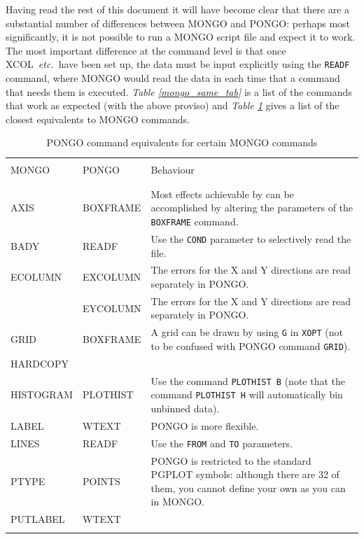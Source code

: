 \documentclass[twoside,11pt]{article}
\newcommand{\htmlref}[2]{#1}
\renewcommand{\_}{\texttt{\symbol{95}}}
\newcommand{\etc}{{\em etc.}}
\newcommand{\xcol}{{\sf XCOL}}
\newcommand{\pnam}[1]{{\tt #1}}
\newcommand{\cnam}[1]{{\tt #1}}
\newcommand{\iref} [1]{\htmlref{#1}{#1}}
\begin{document}
Having read the rest of this document it will have become clear that there
are a substantial number of differences between MONGO and PONGO: perhaps
most significantly, it is not possible to run a MONGO script file and expect it
to work.
The most important difference at the command level is that once
\xcol\ \etc\ have been set up, the data must be input explicitly using the
\cnam{\iref{READF}} command, where MONGO would read the data in each time that a
command that needs them is executed.
{\em Table \ref{mongo_same_tab}} is a list of the commands that work as
expected (with the above proviso) and {\em Table \ref{mongo_diff_tab}} gives a
list of the closest equivalents to MONGO commands.

{\small
\begin{table}
\begin{center}
\begin{tabular}{|l|l|p{}|}
\hline
& & \\
MONGO     & PONGO          & Behaviour \\
& & \\
\hline
& & \\
AXIS      & BOXFRAME       & Most effects achievable by can be  accomplished by
altering the parameters of the \cnam{\iref{BOXFRAME}} command. \\
BADY      & READF          & Use the \pnam{COND} parameter to selectively
read the file. \\
ECOLUMN   & EXCOLUMN       & The errors for the X and Y directions are read
separately in PONGO. \\
          & EYCOLUMN       & The errors for the X and Y directions are read
separately in PONGO. \\
GRID      & BOXFRAME       & A grid can be drawn by using \verb+G+ in
\pnam{XOPT} (not to be confused with PONGO command \cnam{\iref{GRID}}). \\
HARDCOPY  & & \\
HISTOGRAM & PLOTHIST       & Use the command \cnam{\iref{PLOTHIST} B} (note that the
command \cnam{\iref{PLOTHIST} H} will automatically bin unbinned data). \\
LABEL     & WTEXT          & PONGO is more flexible. \\
LINES     & READF          & Use the \pnam{FROM} and \pnam{TO} parameters. \\
PTYPE     & POINTS         & PONGO is restricted to the
standard PGPLOT symbols: although there are 32 of them, you cannot define your
own as you can in MONGO. \\
PUTLABEL  & WTEXT & \\
& & \\ \hline
\end{tabular}
\end{center}
\caption{PONGO command equivalents for certain MONGO commands}
\label{mongo_diff_tab}
\end{table}
}
\end{document}

